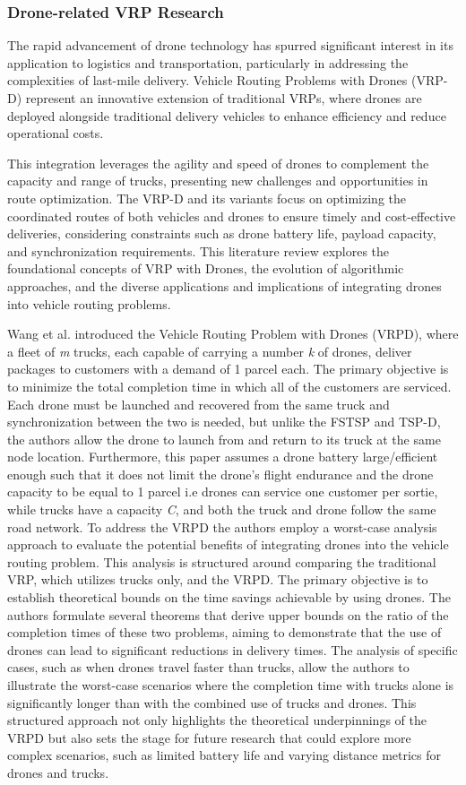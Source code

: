 \documentclass{article}
\begin{document}
	\subsubsection{Drone-related VRP Research}
	The rapid advancement of drone technology has spurred significant interest in its application to logistics and transportation, particularly in addressing the complexities of last-mile delivery. Vehicle Routing Problems with Drones (VRP-D) represent an innovative extension of traditional VRPs, where drones are deployed alongside traditional delivery vehicles to enhance efficiency and reduce operational costs.
	\par
	This integration leverages the agility and speed of drones to complement the capacity and range of trucks, presenting new challenges and opportunities in route optimization. The VRP-D and its variants focus on optimizing
	the coordinated routes of both vehicles and drones to ensure timely and cost-effective deliveries, considering constraints such as drone battery life, payload capacity, and synchronization requirements. This literature review explores the foundational concepts of VRP with Drones, the evolution of algorithmic approaches, and the diverse applications and implications of integrating drones into vehicle routing problems.
	\par 
	Wang et al. \cite{Wang2017} introduced the Vehicle Routing Problem with Drones (VRPD), where a ﬂeet of \textit{m} trucks, each capable of carrying a number \textit{k} of drones, deliver packages to customers with a demand of 1 parcel each. The primary objective is to minimize the total completion time in which all of the customers are serviced. Each drone must be launched and recovered from the same truck and synchronization between the two is needed, but unlike the FSTSP and TSP-D, the authors allow the drone to launch from and return to its truck at the same node location. Furthermore, this paper assumes a drone battery large/efficient enough such that it does not limit the drone's flight endurance and the drone capacity to be equal to 1 parcel i.e drones can service one customer per sortie, while trucks have a capacity \textit{C}, and both the truck and drone follow the same road network. To address the VRPD the authors employ a worst-case analysis approach to evaluate the potential benefits of integrating drones into the vehicle routing problem. This analysis is structured around comparing the traditional VRP, which utilizes trucks only, and the VRPD. The primary objective is to establish theoretical bounds on the time savings achievable by using drones. The authors formulate several theorems that derive upper bounds on the ratio of the completion times of these two problems, aiming to demonstrate that the use of drones can lead to significant reductions in delivery times. The analysis of specific cases, such as when drones travel faster than trucks, allow the authors to illustrate the worst-case scenarios where the completion time with trucks alone is significantly longer than with the combined use of trucks and drones. This structured approach not only highlights the theoretical underpinnings of the VRPD but also sets the stage for future research that could explore more complex scenarios, such as limited battery life and varying distance metrics for drones and trucks.
\end{document}
